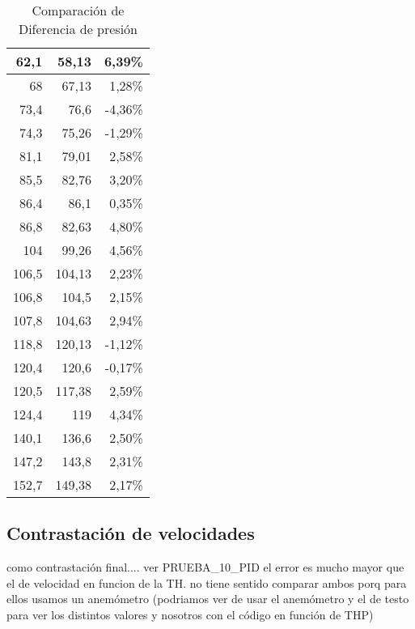 \begin{table}[h!]
\begin{tabular}{|r|r|r}
			62,1 & 58,13 & \multicolumn{1}{r|}{6,39\%} \\ \hline
			68 & 67,13 & \multicolumn{1}{r|}{1,28\%} \\ \hline
			73,4 & 76,6 & \multicolumn{1}{r|}{-4,36\%} \\ \hline
			74,3 & 75,26 & \multicolumn{1}{r|}{-1,29\%} \\ \hline
			81,1 & 79,01 & \multicolumn{1}{r|}{2,58\%} \\ \hline
			85,5 & 82,76 & \multicolumn{1}{r|}{3,20\%} \\ \hline
			86,4 & 86,1 & \multicolumn{1}{r|}{0,35\%} \\ \hline
			86,8 & 82,63 & \multicolumn{1}{r|}{4,80\%} \\ \hline
			104 & 99,26 & \multicolumn{1}{r|}{4,56\%} \\ \hline
			106,5 & 104,13 & \multicolumn{1}{r|}{2,23\%} \\ \hline
			106,8 & 104,5 & \multicolumn{1}{r|}{2,15\%} \\ \hline
			107,8 & 104,63 & \multicolumn{1}{r|}{2,94\%} \\ \hline
			118,8 & 120,13 & \multicolumn{1}{r|}{-1,12\%} \\ \hline
			120,4 & 120,6 & \multicolumn{1}{r|}{-0,17\%} \\ \hline
			120,5 & 117,38 & \multicolumn{1}{r|}{2,59\%} \\ \hline
			124,4 & 119 & \multicolumn{1}{r|}{4,34\%} \\ \hline
			140,1 & 136,6 & \multicolumn{1}{r|}{2,50\%} \\ \hline
			147,2 & 143,8 & \multicolumn{1}{r|}{2,31\%} \\ \hline
			152,7 & 149,38 & \multicolumn{1}{r|}{2,17\%} \\ \hline
		\end{tabular}
	\caption{Comparación de Diferencia de presión}
	\label{difpres}

\end{table}

\subsection{Contrastación de velocidades}
como contrastación final....
ver PRUEBA\_10\_PID
el error es mucho mayor que el de velocidad en funcion de la TH. no tiene sentido comparar ambos porq para ellos usamos  un anemómetro (podriamos ver de usar el anemómetro y el de testo para ver los distintos valores y nosotros con el código en función de THP)





